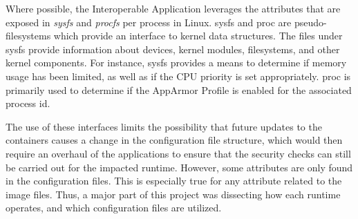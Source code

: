 Where possible, the Interoperable Application leverages the attributes that are exposed in \textit{sysfs} and \textit{procfs} per process in Linux. sysfs and proc are pseudo-filesystems which provide an interface to kernel data structures. The files under sysfs provide information about devices, kernel modules, filesystems, and other kernel components. For instance, sysfs provides a means to determine if memory usage has been limited, as well as if the CPU priority is set appropriately. proc is primarily used to determine if the AppArmor Profile is enabled for the associated process id. 

The use of these interfaces limits the possibility that future updates to the containers causes a change in the configuration file structure, which would then require an overhaul of the applications to ensure that the security checks can still be carried out for the impacted runtime. However, some attributes are only found in the configuration files. This is especially true for any attribute related to the image files. Thus, a major part of this project was dissecting how each runtime operates, and which configuration files are utilized. 


